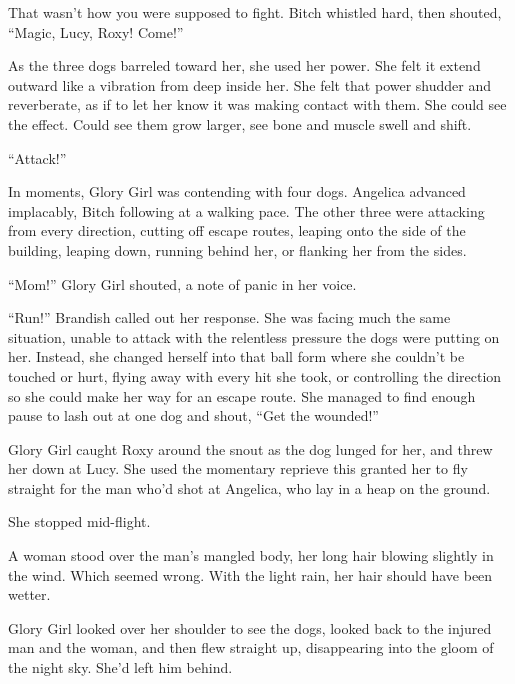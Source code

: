 That wasn't how you were supposed to fight.  Bitch whistled hard, then shouted, ``Magic, Lucy, Roxy!  Come!''



As the three dogs barreled toward her, she used her power.  She felt it extend outward like a vibration from deep inside her.  She felt that power shudder and reverberate, as if to let her know it was making contact with them.  She could see the effect.  Could see them grow larger, see bone and muscle swell and shift.



``Attack!''



In moments, Glory Girl was contending with four dogs.  Angelica advanced implacably, Bitch following at a walking pace.  The other three were attacking from every direction, cutting off escape routes, leaping onto the side of the building, leaping down, running behind her, or flanking her from the sides.



``Mom!'' Glory Girl shouted, a note of panic in her voice.



``Run!'' Brandish called out her response.  She was facing much the same situation, unable to attack with the relentless pressure the dogs were putting on her.  Instead, she changed herself into that ball form where she couldn't be touched or hurt, flying away with every hit she took, or controlling the direction so she could make her way for an escape route.  She managed to find enough pause to lash out at one dog and shout, ``Get the wounded!''



Glory Girl caught Roxy around the snout as the dog lunged for her, and threw her down at Lucy.  She used the momentary reprieve this granted her to fly straight for the man who'd shot at Angelica, who lay in a heap on the ground.



She stopped mid-flight.



A woman stood over the man's mangled body, her long hair blowing slightly in the wind.  Which seemed wrong.  With the light rain, her hair should have been wetter.



Glory Girl looked over her shoulder to see the dogs, looked back to the injured man and the woman, and then flew straight up, disappearing into the gloom of the night sky.  She'd left him behind.



